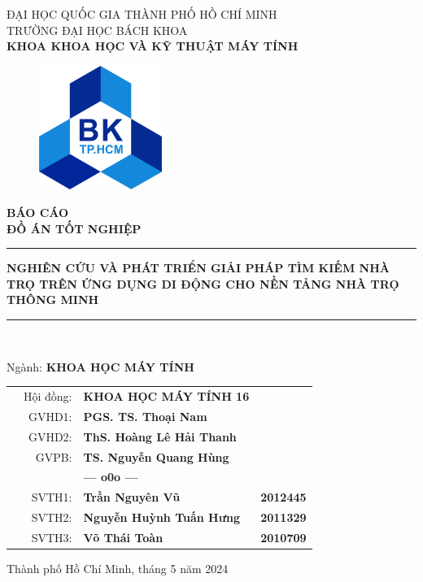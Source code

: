 \begin{titlepage}

\begin{center}
    \large
    ĐẠI HỌC QUỐC GIA THÀNH PHỐ HỒ CHÍ MINH\\
    TRƯỜNG ĐẠI HỌC BÁCH KHOA\\
    \bf
    KHOA KHOA HỌC VÀ KỸ THUẬT MÁY TÍNH\\[1cm]
\end{center}

\begin{figure}[htp]
    \centering
    \includegraphics[width=4cm]{Images/HCMUT_Logo.png}
\end{figure}

\begin{center}
    \Large\bf BÁO CÁO \\ ĐỒ ÁN TỐT NGHIỆP
\end{center}
\begin{center}
    \rule{16cm}{0.5mm}
    \LARGE\bf
    NGHIÊN CỨU VÀ PHÁT TRIỂN GIẢI PHÁP TÌM KIẾM NHÀ TRỌ TRÊN ỨNG DỤNG DI ĐỘNG CHO NỀN TẢNG NHÀ TRỌ THÔNG MINH
    \rule{16cm}{0.5mm}
    \\[0.5cm]
\end{center}
\begin{center}
    \Large Ngành: \textbf{KHOA HỌC MÁY TÍNH}
\end{center}

\begin{table}[h]
    \large
    \begin{tabular}{rrll}
    \hspace{5cm}
    & Hội đồng: &\bf KHOA HỌC MÁY TÍNH 16  \\
    & GVHD1: &\bf PGS. TS. Thoại Nam\\
    & GVHD2: &\bf ThS. Hoàng Lê Hải Thanh\\
    & GVPB: &\bf TS. Nguyễn Quang Hùng \\
    & & \bf \Large --- o0o --- \\
    & SVTH1: &\bf Trần Nguyên Vũ &\bf 2012445 \\
    & SVTH2: &\bf Nguyễn Huỳnh Tuấn Hưng &\bf 2011329 \\
    & SVTH3: &\bf Võ Thái Toàn &\bf 2010709\\
    \end{tabular}
\end{table}

\vspace{0.5cm}
\begin{center}
    \large
    Thành phố Hồ Chí Minh, tháng 5 năm 2024
\end{center}

\end{titlepage}
